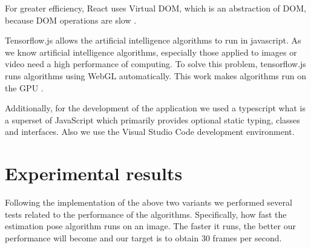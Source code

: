 For greater efficiency, React uses Virtual DOM, which is an abstraction of DOM, because DOM operations are slow \cite{virtual-dom-react}.

Tensorflow.js allows the artificial intelligence algorithms to run in javascript.
As we know artificial intelligence algorithms, especially those applied to images or video need a high performance of computing.
To solve this problem, tensorflow.js runs algorithms using WebGL automatically.
This work makes algorithms run on the GPU \cite{tensorflow.js}.

Additionally, for the development of the application we used a typescript what is a superset of JavaScript which primarily provides optional static typing, classes and interfaces. Also we use the Visual Studio Code development environment.

\section{Experimental results}

Following the implementation of the above two variants we performed several tests related to the performance of the algorithms.
Specifically, how fast the estimation pose algorithm runs on an image. The faster it runs, the better our performance will become and our target is to obtain 30 frames per second.

